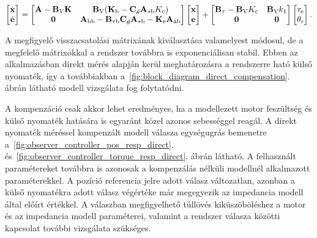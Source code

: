 \begin{align}
    \begin{bmatrix}
        \dot{\mathbf{x}} \\
        \dot{\mathbf{e}}
    \end{bmatrix}
    =
    \begin{bmatrix}
        \mathbf{A} - \mathbf{B}_{\mathrm{V}} \mathbf{K} & \mathbf{B}_{\mathrm{V}} (\mathbf{K}_{\mathrm{b}} - \mathbf{C}_{\ddot\theta} \mathbf{A}_{\mathrm{*b}} K_{\mathrm{c}}) \\
        \mathbf{0} & \mathbf{A}_{\mathrm{bb}} - \mathbf{B}_{\mathrm{\tau b}} \mathbf{C}_{\ddot\theta} \mathbf{A}_{\mathrm{*b}} - \mathbf{K}_{\mathrm{e}} \mathbf{A}_{\mathrm{ab}}
    \end{bmatrix}
    \begin{bmatrix}
        \mathbf{x} \\
        \mathbf{e}
    \end{bmatrix}
    +
    \begin{bmatrix}
        \mathbf{B}_{\mathrm{\tau}} - \mathbf{B}_{\mathrm{V}} K_{\mathrm{c}} & \mathbf{B}_{\mathrm{V}} k_1\\
        \mathbf{0} & \mathbf{0}
    \end{bmatrix}
    \begin{bmatrix}
        \tau_{\mathrm{e}} \\
        \theta_{\mathrm{r}}
    \end{bmatrix}.
\end{align}

A megfigyelő visszacsatolási mátrixának kiválasztása valamelyest módosul, de a megfelelő mátrixokkal
a rendszer továbbra is exponenciálisan stabil. Ebben az alkalmazásban direkt mérés alapján kerül meghatározásra
a rendszerre ható külső nyomaték, így a továbbiakban a~\ref{fig:block_diagram_direct_compensation}. ábrán
látható modell vizsgálata fog folytatódni.

A kompenzáció csak akkor lehet eredményes, ha a modellezett motor feszültség és külső nyomaték hatására is 
egyaránt közel azonos sebességgel reagál. A direkt nyomaték méréssel kompenzált modell válasza egységugrás
bemenetre a~\ref{fig:observer_controller_pos_resp_direct}. és~\ref{fig:observer_controller_torque_resp_direct}. ábrán látható. 
A felhasznált paramétereket továbbra is azonosak a kompenzálás nélküli modellnél alkalmazott paraméterekkel.  
A pozíció referencia jelre adott válasz változatlan, azonban a külső nyomatékra adott válasz végértéke már
megegyezik az impedancia modell által előírt értékkel. A válaszban megfigyelhető túllövés kiküszöböléshez
a motor és az impedancia modell paraméterei, valamint a rendszer válasza közötti kapcsolat további vizsgálata szükséges.

